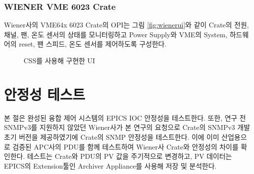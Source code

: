 \documentclass[11pt
  , a4paper
  , article
  , oneside
]{memoir}
\begin{document}
\subsubsection{WIENER VME 6023 Crate }

 Wiener사의 VME64x 6023 Crate의 OPI는 그림 \ref{fig:wienerui}와 같이 Crate의 전원, 채널, 팬, 온도 센서의 상태를 모니터링하고 Power Supply와 VME의 System, 하드웨어의 reset, 팬 스피드, 온도 센서를 제어하도록 구성한다.


 \begin{figure}[!h]
   \centering
               \hfill
               \hfill
   \caption
       {
CSS를 사용해 구현한 UI
       }
  \label{fig:cssopi}
 \end{figure}

\clearpage

\section{안정성 테스트}
본 절은 완성된 융합 제어 시스템의 EPICS IOC 안정성을 테스트한다. 또한, 연구 전 SNMPv3를 지원하지 않았던 Wiener사가 본 연구의 요청으로 Crate의 SNMPv3 개발 초기 버전을 제공하였기에 Crate의 SNMP 안정성을 테스트한다. 이에 이미 산업용으로 검증된 APC사의 PDU를 함께 테스트하여 Wiener사 Crate와 안정성의 차이를 확인한다. 테스트는 Crate와 PDU의 PV 값을 주기적으로 변경하고, PV 데이터는 EPICS의 Extension툴인 Archiver Appliance를 사용해 저장 및 분석한다. 
\end{document}
